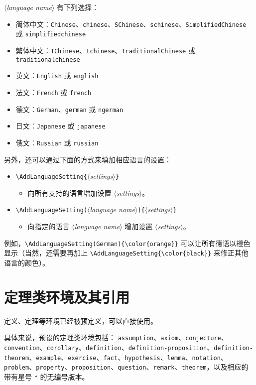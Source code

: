 \documentclass{simplivre}
\providecommand{\meta}[1]{$\langle${\normalfont\itshape#1}$\rangle$}
\begin{document}
\meta{language name} 有下列选择：
\begin{itemize}
    \item 简体中文：\texttt{Chinese}、\texttt{chinese}、\texttt{SChinese}、\texttt{schinese}、\texttt{SimplifiedChinese} \\\hspace*{5em}或 \texttt{simplifiedchinese}
    \item 繁体中文：\texttt{TChinese}、\texttt{tchinese}、\texttt{TraditionalChinese} 或 \texttt{traditionalchinese}
    \item 英文：\texttt{English} 或 \texttt{english}
    \item 法文：\texttt{French} 或 \texttt{french}
    \item 德文：\texttt{German}、\texttt{german} 或 \texttt{ngerman}
    \item 日文：\texttt{Japanese} 或 \texttt{japanese}
    \item 俄文：\texttt{Russian} 或 \texttt{russian}
\end{itemize}

另外，还可以通过下面的方式来填加相应语言的设置：
\begin{itemize}
    \item \lstinline|\AddLanguageSetting{|\meta{settings}\lstinline|}|
    \begin{itemize}
        \item 向所有支持的语言增加设置 \meta{settings}。
    \end{itemize}
    \item \lstinline|\AddLanguageSetting(|\meta{language name}\lstinline|){|\meta{settings}\lstinline|}|
    \begin{itemize}
        \item 向指定的语言 \meta{language name} 增加设置 \meta{settings}。
    \end{itemize}
\end{itemize}
例如，\lstinline|\AddLanguageSetting(German){\color{orange}}| 可以让所有德语以橙色显示（当然，还需要再加上 \lstinline|\AddLanguageSetting{\color{black}}| 来修正其他语言的颜色）。


\section{定理类环境及其引用}

定义、定理等环境已经被预定义，可以直接使用。

具体来说，预设的定理类环境包括：
\texttt{assumption}、\texttt{axiom}、\texttt{conjecture}、\texttt{convention}、\texttt{corollary}、\texttt{definition}、\texttt{definition-proposition}、\texttt{definition-theorem}、\texttt{example}、\texttt{exercise}、\texttt{fact}、\texttt{hypothesis}、\texttt{lemma}、\texttt{notation}、\texttt{problem}、\texttt{property}、\texttt{proposition}、\texttt{question}、\texttt{remark}、\texttt{theorem}，以及相应的带有星号 \lstinline|*| 的无编号版本。
\end{document}
